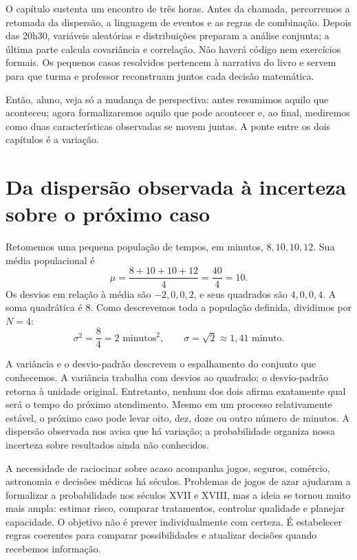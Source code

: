 O capítulo sustenta um encontro de três horas. Antes da chamada, percorremos a retomada da dispersão, a linguagem de eventos e as regras de combinação. Depois das 20h30, variáveis aleatórias e distribuições preparam a análise conjunta; a última parte calcula covariância e correlação. Não haverá código nem exercícios formais. Os pequenos casos resolvidos pertencem à narrativa do livro e servem para que turma e professor reconstruam juntos cada decisão matemática.

\begin{SummaryBox}
Então, aluno, veja só a mudança de perspectiva: antes resumimos aquilo que aconteceu; agora formalizaremos aquilo que pode acontecer e, ao final, mediremos como duas características observadas se movem juntas. A ponte entre os dois capítulos é a variação.
\end{SummaryBox}

\section{Da dispersão observada à incerteza sobre o próximo caso}

Retomemos uma pequena população de tempos, em minutos, ${8,10,10,12}$. Sua média populacional é
\[
\mu=\frac{8+10+10+12}{4}=\frac{40}{4}=10.
\]
Os desvios em relação à média são $-2,0,0,2$, e seus quadrados são $4,0,0,4$. A soma quadrática é $8$. Como descrevemos toda a população definida, dividimos por $N=4$:
\[
\sigma^2=\frac{8}{4}=2\text{ minutos}^2,
\qquad
\sigma=\sqrt{2}\approx1{,}41\text{ minuto}.
\]

A variância e o desvio-padrão descrevem o espalhamento do conjunto que conhecemos. A variância trabalha com desvios ao quadrado; o desvio-padrão retorna à unidade original. Entretanto, nenhum dos dois afirma exatamente qual será o tempo do próximo atendimento. Mesmo em um processo relativamente estável, o próximo caso pode levar oito, dez, doze ou outro número de minutos. A dispersão observada nos avisa que há variação; a probabilidade organiza nossa incerteza sobre resultados ainda não conhecidos.

A necessidade de raciocinar sobre acaso acompanha jogos, seguros, comércio, astronomia e decisões médicas há séculos. Problemas de jogos de azar ajudaram a formalizar a probabilidade nos séculos XVII e XVIII, mas a ideia se tornou muito mais ampla: estimar risco, comparar tratamentos, controlar qualidade e planejar capacidade. O objetivo não é prever individualmente com certeza. É estabelecer regras coerentes para comparar possibilidades e atualizar decisões quando recebemos informação.

